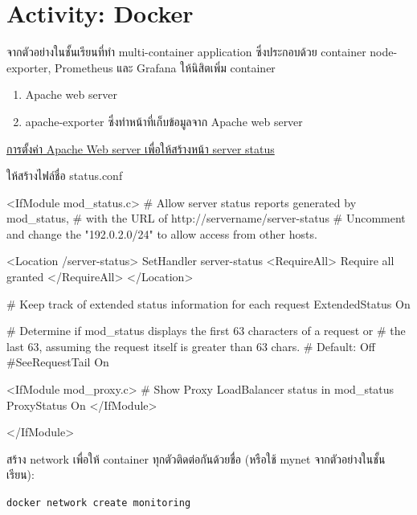 \documentclass[a4paper, 10pt]{article}
\begin{document}
\subject
{}

\section*{Activity: Docker}

\textthai{จากตัวอย่างในชั้นเรียนที่ทำ} multi-container application \textthai{ซึ่งประกอบด้วย} container node-exporter,
Prometheus \textthai{และ} Grafana \textthai{ให้นิสิตเพิ่ม} container
\begin{enumerate}
	\item Apache web server
	\item apache-exporter \textthai{ซึ่งทำหน้าที่เก็บข้อมูลจาก} Apache web server
\end{enumerate}

\par\noindent \underline{\textthai{การตั้งค่า} Apache Web server \textthai{เพื่อให้สร้างหน้า} server status}
\par \textthai{ให้สร้างไฟล์ชื่อ} status.conf
\begin{codingbox}[language=bash]
<IfModule mod_status.c>
# Allow server status reports generated by mod_status,
# with the URL of http://servername/server-status
# Uncomment and change the "192.0.2.0/24" to allow access from other hosts.

<Location /server-status>
SetHandler server-status
<RequireAll>
Require all granted
</RequireAll>
</Location>

# Keep track of extended status information for each request
ExtendedStatus On

# Determine if mod_status displays the first 63 characters of a request or
# the last 63, assuming the request itself is greater than 63 chars.
# Default: Off
#SeeRequestTail On

<IfModule mod_proxy.c>
# Show Proxy LoadBalancer status in mod_status
ProxyStatus On
</IfModule>

</IfModule>
\end{codingbox}

\par\noindent \textthai{สร้าง} network \textthai{เพื่อให้} container \textthai{ทุกตัวติดต่อกันด้วยชื่อ} (\textthai{หรือใช้} mynet \textthai{จากตัวอย่างในชั้นเรียน}):

\begin{center}\texttt{docker network create monitoring}\end{center}
\end{document}

